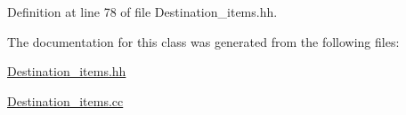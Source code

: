 Definition at line 78 of file Destination\+\_\+items.\+hh.



The documentation for this class was generated from the following files\+:\begin{DoxyCompactItemize}
\item 
\hyperlink{_destination__items_8hh}{Destination\+\_\+items.\+hh}\item 
\hyperlink{_destination__items_8cc}{Destination\+\_\+items.\+cc}\end{DoxyCompactItemize}
